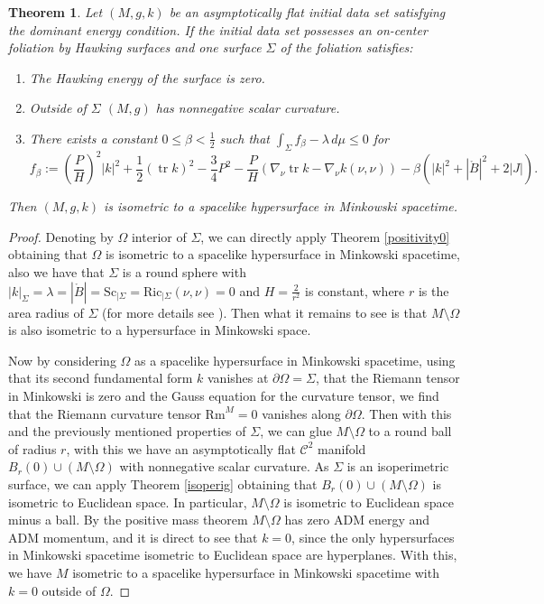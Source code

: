\documentclass[12pt,a4paper]{amsart}
\theoremstyle{plain}
\newtheorem{theorem}{Theorem}[section]
\theoremstyle{definition}
\newcommand{\tr}{\operatorname{tr}}
\begin{document}
\begin{theorem}\label{rigigeneralfoli}
   Let $(M,g,k)$ be an asymptotically flat  initial data set satisfying the dominant energy condition. If the initial data set possesses an on-center foliation by Hawking surfaces   and one  surface $\Sigma$ of the foliation satisfies:

    \begin{enumerate}[label=(\roman*)]
    
    \item The Hawking energy of the surface is zero.
    
    \item Outside of $\Sigma$  $(M,g)$ has nonnegative scalar curvature. 

    \item There exists a constant $0 \leq\beta <\frac{1}{2}$ such that $\int_\Sigma f_\beta -\lambda \, d\mu \leq 0$  for 
 \begin{equation}
       f_\beta:= \left( \frac{P}{H}\right)^2|k|^2+ \frac{1}{2 }(\tr k)^2   - \frac{3}{4} P^2- \frac{P}{H}( \nabla_\nu \tr k - \nabla_\nu k(\nu,\nu ))  -  \beta( |k|^2 + |\mathring{B}|^2 +2|J|).
    \end{equation}
\end{enumerate}    
Then $(M,g,k)$ is isometric to a spacelike hypersurface in  Minkowski spacetime.
\end{theorem}
\begin{proof}
Denoting by $\Omega$ interior of $\Sigma$, we can directly apply Theorem \ref{positivity0} obtaining that $\Omega$  is isometric to a spacelike hypersurface in Minkowski spacetime,  also we have that $\Sigma$ is a round sphere with $|k|_{\Sigma} =\lambda=|\mathring{B}|= \mathrm{Sc}_{| \Sigma} =\mathrm{Ric}_{| \Sigma}(\nu, \nu)=0$ and $H=\frac{2}{r^2}$ is constant, where $r$ is the area radius of $\Sigma$ (for more details see \cite[Theorem 3.6]{rigidiaz}). Then what it remains to see is that $M \setminus \Omega$ is also isometric to a hypersurface in Minkowski space.


Now by considering $\Omega$ as a spacelike hypersurface in Minkowski spacetime,  using that its second fundamental form  $ k$ vanishes at $\partial \Omega = \Sigma$, that the Riemann tensor in Minkowski is zero and the Gauss equation for the curvature tensor, we find that the Riemann curvature tensor $ \mathrm{Rm}^M=0$ vanishes along $\partial \Omega$.  Then with this and the previously mentioned properties of $\Sigma$, we can glue $ M \setminus \Omega$ to a round ball of radius $r$, with this we have an asymptotically flat $ \mathcal{C}^2$ manifold  $B_r(0)\cup (M \setminus \Omega) $ with nonnegative scalar curvature. As $\Sigma$ is an isoperimetric surface, we can apply Theorem \ref{isoperig}  obtaining that $B_r(0)\cup (M \setminus \Omega) $ is isometric to Euclidean space. In particular,  $M \setminus \Omega $ is isometric to Euclidean space minus a ball. By the positive mass theorem $M \setminus \Omega $ has zero ADM energy and ADM momentum, and it is direct to see that $k=0$, since the only hypersurfaces in Minkowski spacetime isometric to Euclidean space are hyperplanes.  With this, we have  $M$ isometric to a spacelike hypersurface in Minkowski spacetime with $k=0$ outside of $\Omega$. 
\end{proof}
\end{document}
